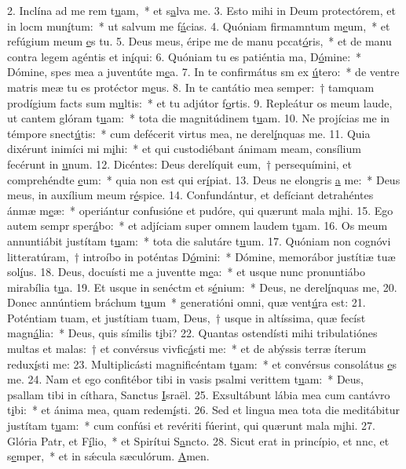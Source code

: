 2. Inclína ad me rem t\uline{u}am,~* et s\uline{a}lva me.
3. Esto mihi in Deum protectórem, et in locm mun\uline{í}tum:~* ut salvum me f\uline{á}cias.
4. Quóniam firmamntum m\uline{e}um,~* et refúgium meum \uline{e}s tu.
5. Deus meus, éripe me de manu pccat\uline{ó}ris,~* et de manu contra legem agéntis et in\uline{í}qui:
6. Quóniam tu es patiéntia ma, D\uline{ó}mine:~* Dómine, spes mea a juventúte m\uline{e}a.
7. In te confirmátus sm ex \uline{ú}tero:~* de ventre matris meæ tu es protéctor m\uline{e}us.
8. In te cantátio mea semper:~† tamquam prodígium facts sum m\uline{u}ltis:~* et tu adjútor f\uline{o}rtis.
9. Repleátur os meum laude, ut cantem glóram t\uline{u}am:~* tota die magnitúdinem t\uline{u}am.
10. Ne projícias me in témpore snect\uline{ú}tis:~* cum defécerit virtus mea, ne derel\uline{í}nquas me.
11. Quia dixérunt inimíci mi m\uline{i}hi:~* et qui custodiébant ánimam meam, consílium fecérunt in \uline{u}num.
12. Dicéntes: Deus derelíquit eum,~† persequímini, et comprehéndte \uline{e}um:~* quia non est qui er\uline{í}piat.
13. Deus ne elongris \uline{a} me:~* Deus meus, in auxílium meum r\uline{é}spice.
14. Confundántur, et defíciant detrahéntes ánmæ m\uline{e}æ:~* operiántur confusióne et pudóre, qui quærunt mala m\uline{i}hi.
15. Ego autem sempr sper\uline{á}bo:~* et adjíciam super omnem laudem t\uline{u}am.
16. Os meum annuntiábit justítam t\uline{u}am:~* tota die salutáre t\uline{u}um.
17. Quóniam non cognóvi litteratúram,~† introíbo in poténtas D\uline{ó}mini:~* Dómine, memorábor justítiæ tuæ sol\uline{í}us.
18. Deus, docuísti me a juventte m\uline{e}a:~* et usque nunc pronuntiábo mirabília t\uline{u}a.
19. Et usque in senéctm et s\uline{é}nium:~* Deus, ne derel\uline{í}nquas me,
20. Donec annúntiem bráchum t\uline{u}um~* generatióni omni, quæ vent\uline{ú}ra est:
21. Poténtiam tuam, et justítiam tuam, Deus,~† usque in altíssima, quæ fecíst magn\uline{á}lia:~* Deus, quis símilis t\uline{i}bi?
22. Quantas ostendísti mihi tribulatiónes multas et malas:~† et convérsus vivfic\uline{á}sti me:~* et de abýssis terræ íterum redux\uline{í}sti me:
23. Multiplicásti magnificéntam t\uline{u}am:~* et convérsus consolátus \uline{e}s me.
24. Nam et ego confitébor tibi in vasis psalmi verittem t\uline{u}am:~* Deus, psallam tibi in cíthara, Sanctus \uline{I}sraël.
25. Exsultábunt lábia mea cum cantávro t\uline{i}bi:~* et ánima mea, quam redem\uline{í}sti.
26. Sed et lingua mea tota die meditábitur justítam t\uline{u}am:~* cum confúsi et revériti fúerint, qui quærunt mala m\uline{i}hi.
27. Glória Patr, et F\uline{í}lio,~* et Spirítui S\uline{a}ncto.
28. Sicut erat in princípio, et nnc, et s\uline{e}mper,~* et in sǽcula sæculórum. \uline{A}men.
